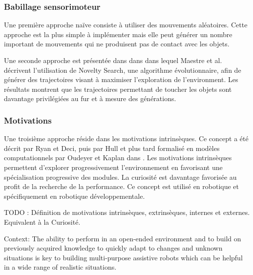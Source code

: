 \documentclass{llncs}
\begin{document}
\subsubsection{Babillage sensorimoteur}
Une première approche naïve consiste à utiliser des mouvements aléatoires. Cette approche est la plus simple à implémenter mais elle peut générer un nombre important de mouvements qui ne produisent pas de contact avec les objets.

Une seconde approche est présentée dans dans \cite{Maestre2015} dans lequel Maestre et al. décrivent l'utilisation de Novelty Search, une algorithme évolutionnaire, afin de générer des trajectoires visant à maximiser l'exploration de l'environment. Les résultats montrent que les trajectoires permettant de toucher les objets sont davantage privilégiées au fur et à mesure des générations.




\subsubsection{Motivations}
Une troisième approche réside dans les motivations intrinsèques. Ce concept a été décrit par Ryan et Deci, puis par Hull et plus tard formalisé en modèles computationnels par Oudeyer et Kaplan dans \cite{10.3389/neuro.12.006.2007}. Les motivations intrinsèques permettent d'explorer progressivement l'environnement en favorisant une spécialisation progressive des modules. La curiosité est davantage favorisée au profit de la recherche de la performance. Ce concept est utilisé en robotique et spécifiquement en robotique développementale.

TODO : Définition de motivations intrinsèques, extrinsèques, internes et externes. Equivalent à la Curiosité.








Context: The ability to perform in an open-ended environment and to build on previously acquired knowledge to quickly adapt to changes and unknown situations is key to building
multi-purpose assistive robots which can be helpful in a wide range of realistic situations.
\end{document}
